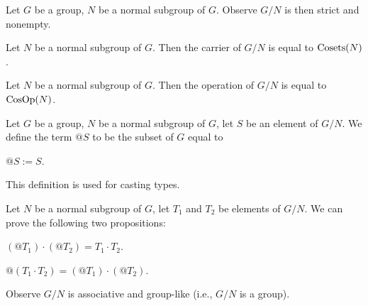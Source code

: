 \documentclass{article}
\begin{document}
Let $G$ be a group, $N$ be a normal subgroup of $G$. Observe $G/N$ is
then strict and nonempty.

\begin{thm}
\item\label{group6:17} Let $N$ be a normal subgroup of $G$.
  Then the carrier of $G/N$ is equal to $\operatorname{Cosets}(N)$.
\item\label{group6:18} Let $N$ be a normal subgroup of $G$.
  Then the operation of $G/N$ is equal to $\operatorname{CosOp}(N)$.
\end{thm}

\begin{definition}
Let $G$ be a group, $N$ be a normal subgroup of $G$, let $S$ be an
element of $G/N$.
We define the term $@S$ to be the subset of $G$ equal to
\begin{defn}
\item $@S := S$.
\end{defn}
\end{definition}
\begin{remark}
This definition is used for casting types.
\end{remark}

Let $N$ be a normal subgroup of $G$,
  let $T_{1}$ and $T_{2}$ be elements of $G/N$.
We can prove the following two propositions:
\begin{thm}
\item\label{group6:19} $(@T_{1})\cdot(@T_{2})=T_{1}\cdot T_{2}$.
\item\label{group6:20} $@(T_{1}\cdot T_{2})=(@T_{1})\cdot(@T_{2})$.
\end{thm}

Observe $G/N$ is associative and group-like (i.e., $G/N$ is a group).
\end{document}
